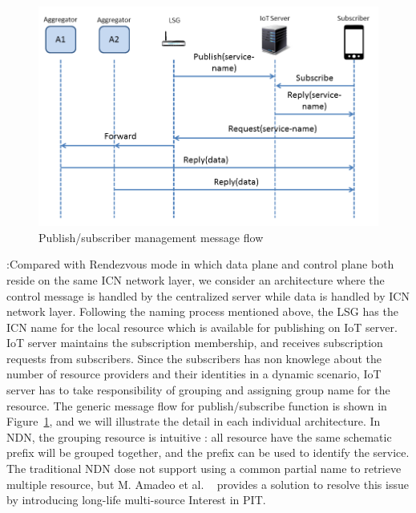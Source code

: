 \begin{figure}
\includegraphics[width=\columnwidth]{figure/pub_sub.png}
\caption{\label{fig:pubsub}Publish/subscriber management message flow}
\end{figure}
\vspace{1mm}:Compared with Rendezvous mode in which data plane and control plane both reside on the same ICN network layer, we consider an architecture where the control message is handled by the centralized server while data is handled by ICN network layer.  Following the naming process mentioned above, the LSG has the ICN name for the local resource which is available for publishing on IoT server.  IoT server maintains the subscription membership, and receives subscription requests from subscribers. Since the subscribers has non knowlege about the number of resource providers and their identities  in a dynamic scenario,  IoT server has to take responsibility of grouping and assigning group name for the resource. The generic message flow for publish/subscribe function is shown in Figure~\ref{fig:pubsub}, and we will illustrate the detail in each individual architecture.
In NDN, the grouping resource is intuitive : all resource have the same schematic prefix will be grouped together, and the prefix can be used to identify the service. The traditional NDN dose not support using a common partial name to retrieve multiple resource, but M. Amadeo et al. ~\cite{amadeo2014multi} provides a solution to resolve this issue by introducing long-life multi-source Interest in PIT.
